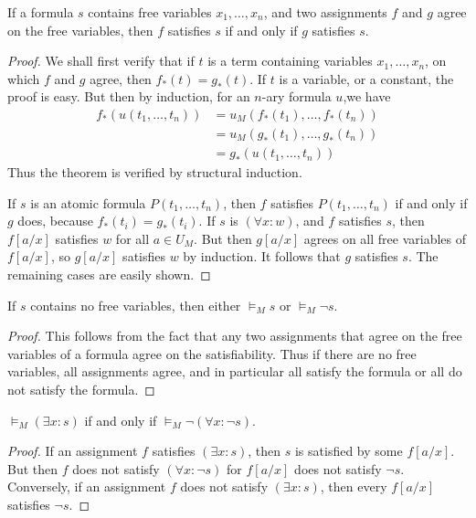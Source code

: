 \begin{lemma} If a formula $s$ contains free variables $x_1, \dots, x_n$, and two assignments $f$ and $g$ agree on the free variables, then $f$ satisfies $s$ if and only if $g$ satisfies $s$. \end{lemma}
\begin{proof}
    We shall first verify that if $t$ is a term containing variables $x_1, \dots, x_n$, on which $f$ and $g$ agree, then $f_*(t) = g_*(t)$. If $t$ is a variable, or a constant, the proof is easy. But then by induction, for an $n$-ary formula $u$,we have
    \begin{align*}
        f_*(u(t_1, \dots, t_n)) &= u_M(f_*(t_1), \dots, f_*(t_n))\\
        &= u_M(g_*(t_1), \dots, g_*(t_n))\\
        &= g_*(u(t_1, \dots, t_n))
    \end{align*}
    Thus the theorem is verified by structural induction.

    If $s$ is an atomic formula $P(t_1, \dots, t_n)$, then $f$ satisfies $P(t_1, \dots, t_n)$ if and only if $g$ does, because $f_*(t_i) = g_*(t_i)$. If $s$ is $(\forall x: w)$, and $f$ satisfies $s$, then $f[a/x]$ satisfies $w$ for all $a \in U_M$. But then $g[a/x]$ agrees on all free variables of $f[a/x]$, so $g[a/x]$ satisfies $w$ by induction. It follows that $g$ satisfies $s$. The remaining cases are easily shown.
\end{proof}

\begin{theorem}
    If $s$ contains no free variables, then either $\vDash_M s$ or $\vDash_M \neg s$.
\end{theorem}
\begin{proof}
    This follows from the fact that any two assignments that agree on the free variables of a formula agree on the satisfiability. Thus if there are no free variables, all assignments agree, and in particular all satisfy the formula or all do not satisfy the formula.
\end{proof}

\begin{lemma} $\vDash_M (\exists x: s)$ if and only if $\vDash_M \neg (\forall x: \neg s)$. \end{lemma}
\begin{proof}
    If an assignment $f$ satisfies $(\exists x: s)$, then $s$ is satisfied by some $f[a/x]$. But then $f$ does not satisfy $(\forall x: \neg s)$ for $f[a/x]$ does not satisfy $\neg s$. Conversely, if an assignment $f$ does not satisfy $(\exists x: s)$, then every $f[a/x]$ satisfies $\neg s$.
\end{proof}

